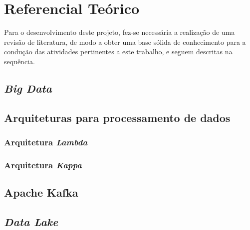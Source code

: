 \chapter{Referencial Teórico}

Para o desenvolvimento deste projeto, fez-se necessária a realização de uma revisão de literatura, 
de modo a obter uma base sólida de conhecimento para a condução das atividades pertinentes a este trabalho, 
e seguem descritas na sequência.

\section{\textit{Big Data}}
 \cite{sagiroglu2013big}

\section{Arquiteturas para processamento de dados}
\subsection{Arquitetura \textit{Lambda}}
\subsection{Arquitetura \textit{Kappa}}

\section{Apache Kafka}

\section{\textit{Data Lake}}